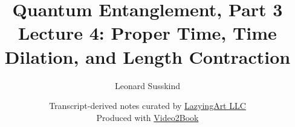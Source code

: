 \documentclass[11pt,oneside]{book}
\begin{document}
\hypersetup{pageanchor=false}
\frontmatter
\title{Quantum Entanglement, Part 3\\[0.45em]
\large Lecture 4: Proper Time, Time Dilation, and Length Contraction}
\author{Leonard Susskind}
\date{Transcript-derived notes curated by
\href{https://lazying.art}{LazyingArt LLC}\\[0.35em]
\small Produced with
\href{https://github.com/lachlanchen/Video2Book}{Video2Book}}
\maketitle
\hypersetup{pageanchor=true}
\mainmatter

\end{document}
